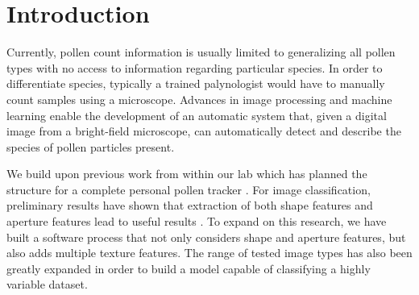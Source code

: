 \section{Introduction}

Currently, pollen count information is usually limited to generalizing all pollen types with no access to information regarding particular species. In order to differentiate species, typically a trained palynologist would have to manually count samples using a microscope. Advances in image processing and machine learning enable the development of an automatic system that, given a digital image from a bright-field microscope, can automatically detect and describe the species of pollen particles present.

We build upon previous work from within our lab which has planned the structure for a complete personal pollen tracker \cite{Lozano_2012}. For image classification, preliminary results have shown that extraction of both shape features and aperture features lead to useful results \cite{Lozano_2014}. To expand on this research, we have built a software process that not only considers shape and aperture features, but also adds multiple texture features. The range of tested image types has also been greatly expanded in order to build a model capable of classifying a highly variable dataset. 

  
  
  
  